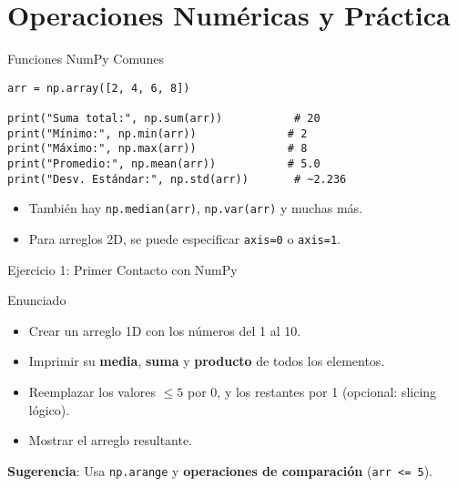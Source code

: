 \documentclass[10pt]{beamer}
\begin{document}
\section{Operaciones Numéricas y Práctica}

\begin{frame}[fragile]{Funciones NumPy Comunes}
\begin{verbatim}
arr = np.array([2, 4, 6, 8])

print("Suma total:", np.sum(arr))           # 20
print("Mínimo:", np.min(arr))              # 2
print("Máximo:", np.max(arr))              # 8
print("Promedio:", np.mean(arr))           # 5.0
print("Desv. Estándar:", np.std(arr))       # ~2.236
\end{verbatim}
\begin{itemize}
  \item También hay \texttt{np.median(arr)}, \texttt{np.var(arr)} y muchas más.
  \item Para arreglos 2D, se puede especificar \texttt{axis=0} o \texttt{axis=1}.
\end{itemize}
\end{frame}

\begin{frame}{Ejercicio 1: Primer Contacto con NumPy}
  \begin{block}{Enunciado}
    \begin{itemize}
      \item Crear un arreglo 1D con los números del 1 al 10.
      \item Imprimir su \textbf{media}, \textbf{suma} y \textbf{producto} de todos los elementos.
      \item Reemplazar los valores \(\leq 5\) por 0, y los restantes por 1 (opcional: slicing lógico).
      \item Mostrar el arreglo resultante.
    \end{itemize}
  \end{block}
  \textbf{Sugerencia}: Usa \texttt{np.arange} y \textbf{operaciones de comparación} (\texttt{arr <= 5}).
\end{frame}
\end{document}
